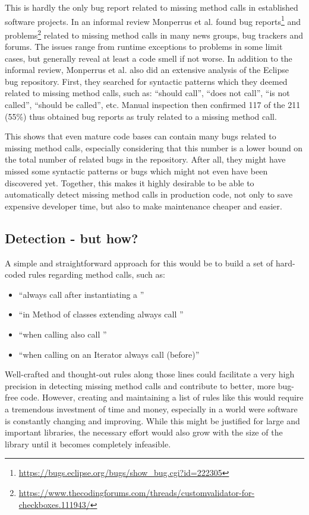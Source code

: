 This is hardly the only bug report related to missing method calls in established software projects.
In an informal review Monperrus et al. found bug reports\footnote{\url{https://bugs.eclipse.org/bugs/show_bug.cgi?id=222305}} and problems\footnote{\url{https://www.thecodingforums.com/threads/customvalidator-for-checkboxes.111943/}} related to missing method calls in many news groups, bug trackers and forums.
The issues range from runtime exceptions to problems in some limit cases, but generally reveal at least a code smell if not worse.
In addition to the informal review, Monperrus et al. \cite{monperrus2013detecting} also did an extensive analysis of the Eclipse bug repository.
First, they searched for syntactic patterns which they deemed related to missing method calls, such as: ``should call'', ``does not call'', ``is not called'', ``should be called'', etc.
Manual inspection then confirmed 117 of the 211 (55\%) thus obtained bug reports as truly related to a missing method call.

This shows that even mature code bases can contain many bugs related to missing method calls, especially considering that this number is a lower bound on the total number of related bugs in the repository.
After all, they might have missed some syntactic patterns or bugs which might not even have been discovered yet.
Together, this makes it highly desirable to be able to automatically detect missing method calls in production code, not only to save expensive developer time, but also to make maintenance cheaper and easier.

\subsection{Detection - but how?}
A simple and straightforward approach for this would be to build a set of hard-coded rules regarding method calls, such as:
\begin{itemize}
    \item ``always call  after instantiating a ''
    \item ``in Method  of classes extending  always call ''
    \item ``when calling  also call ''
    \item ``when calling  on an Iterator always call  (before)''
\end{itemize}
Well-crafted and thought-out rules along those lines could facilitate a very high precision in detecting missing method calls and contribute to better, more bug-free code.
However, creating and maintaining a list of rules like this would require a tremendous investment of time and money, especially in a world were software is constantly changing and improving.
While this might be justified for large and important libraries, the necessary effort would also grow with the size of the library until it becomes completely infeasible.

